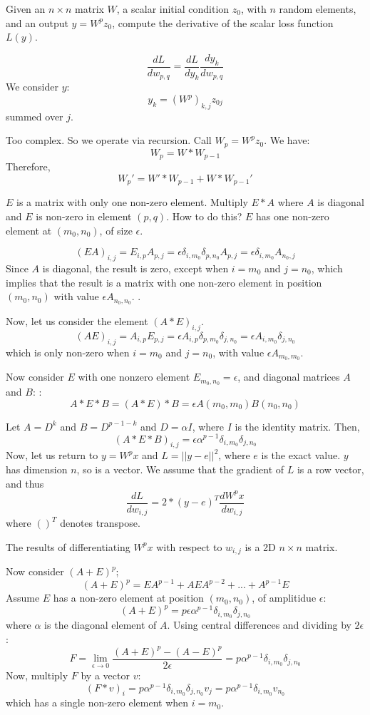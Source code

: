 \documentclass[11pt]{article}
\begin{document}
Given an $n\times n$ matrix $W$, a scalar initial condition $z_0$, with $n$ random elements, 
and an output $y = W^p z_0$, compute the derivative of the scalar loss function $L(y)$. 

$$
\frac{dL}{dw_{p,q}} = \frac{dL}{dy_k}\frac{dy_k}{dw_{p,q}}
$$
We consider $y$: 
$$
y_k = (W^p)_{k,j} z_{0j}
$$
summed over $j$. 

Too complex. So we operate via recursion.
Call $W_p = W^p z_0$. We have: 
$$
W_p = W * W_{p-1}
$$
Therefore, 
$$
W_p' = W' * W_{p-1} + W * W_{p-1}'
$$



$E$ is a matrix with only one non-zero element. 
Multiply $E * A$ where $A$ is diagonal and $E$ is non-zero in element $(p,q)$. How to do this? 
$E$ has one non-zero element at $(m_0, n_0)$, of size $\epsilon$. 

$$
(E A)_{i,j} = E_{i,p} A_{p,j} = \epsilon \delta_{i,m_0}\delta_{p,n_0} A_{p,j} 
    = \epsilon \delta_{i,m_0} A_{n_0,j}
$$
Since $A$ is diagonal, the result is zero, except when $i=m_0$ and $j=n_0$, which implies that the result
is a matrix with one non-zero element in position $(m_0, n_0)$ with value $\epsilon A_{n_0, n_0}$. . 

Now, let us consider the element  $(A * E)_{i,j}$. 
$$
(A E)_{i,j} = A_{i,p} E_{p,j} = \epsilon A_{i,p} \delta_{p,m_0}\delta_{j,n_0}
    = \epsilon A_{i,m_0} \delta_{j,n_0}
$$
which is only non-zero when $i=m_0$ and $j=n_0$, with value $\epsilon A_{m_0, m_0}$. 

Now consider $E$ with one nonzero element $E_{m_0, n_0}=\epsilon$, and diagonal matrices $A$ and $B$: : 
$$
A*E*B = (A*E)*B = \epsilon A(m_0,m_0) B(n_0,n_0)
$$

Let $A = D^k$ and $B = D^{p-1-k}$ and $D = \alpha I$, where $I$ is the identity matrix. Then, 
$$
(A*E*B)_{i,j} = \epsilon \alpha^{p-1}\delta_{i,m_0}\delta_{j,n_0} 
$$
Now, let us return to $y= W^p x$ and $L=||y-e||^2$, where $e$ is the exact value. $y$ has dimension $n$, so is a vector. 
We assume that the gradient of $L$ is a row vector, and thus
$$
\frac{dL}{dw_{i,j}} = 2* (y-e)^T \frac{dW^p x}{dw_{i,j}}    
$$
where $()^T$ denotes transpose. 

The results of differentiating $W^p x$ with respect to $w_{i,j}$ is a 2D $n\times n$ matrix. 

Now consider $(A + E)^p$; 
$$
(A + E)^p = E A^{p-1} + A E A^{p-2} + ... + A^{p-1} E
$$
Assume $E$ has a non-zero element at position $(m_0, n_0)$, of amplitidue $\epsilon$: 
$$
(A + E)^p = p\epsilon\alpha^{p-1} \delta_{i,m_0}\delta_{j,n_0}
$$
where $\alpha$ is the diagonal element of $A$. Using central differences and dividing by $2\epsilon$: 
$$
F = \lim_{\epsilon\rightarrow 0} \frac{(A + E)^p-(A-E)^p}{2\epsilon} = p\alpha^{p-1} \delta_{i,m_0}\delta_{j,n_0}
$$
Now, multiply $F$ by a vector $v$: 
$$
(F*v)_i =  p\alpha^{p-1} \delta_{i,m_0}\delta_{j,n_0} v_j = p\alpha^{p-1} \delta_{i,m_0} v_{n_0}
$$
which has a single non-zero element when $i=m_0$. 
\end{document}
